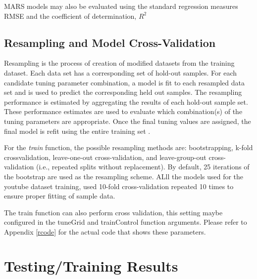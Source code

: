 \documentclass[letterpaper,12pt,titlepage,oneside,final]{report}
\begin{document}
                    MARS models may also be evaluated using the standard regression measures RMSE and the coefficient of determination, $R^2$

        \subsection {Resampling and Model Cross-Validation}
            Resampling is the process of creation of modified datasets from the training dataset. Each data set has a corresponding set of hold-out samples. For each candidate tuning parameter combination, a model is fit to each resampled data set and is used to predict the corresponding held out samples. The resampling performance is estimated by aggregating the results of each hold-out sample set. These performance estimates are used to evaluate which combination(s) of the tuning parameters are appropriate. Once the final tuning values are assigned, the final model is refit using the entire training set \cite{Kuhn2008}.

            For the \textit{train} function, the possible resampling methods are: bootstrapping, k-fold crossvalidation, leave-one-out cross-validation, and leave-group-out cross-validation (i.e., repeated splits without replacement). By default, 25 iterations of the bootstrap are used as the resampling scheme. ALll the models used for the youtube dataset training, used 10-fold cross-validation repeated 10 times to ensure proper fitting of sample data.

            The train function can also perform cross validation, this setting maybe configured in the tuneGrid and trainControl function arguments. Please refer to Appendix \ref{rcode} for the actual code that shows these parameters.
        \clearpage

    \section {Testing/Training Results}
\end{document}
